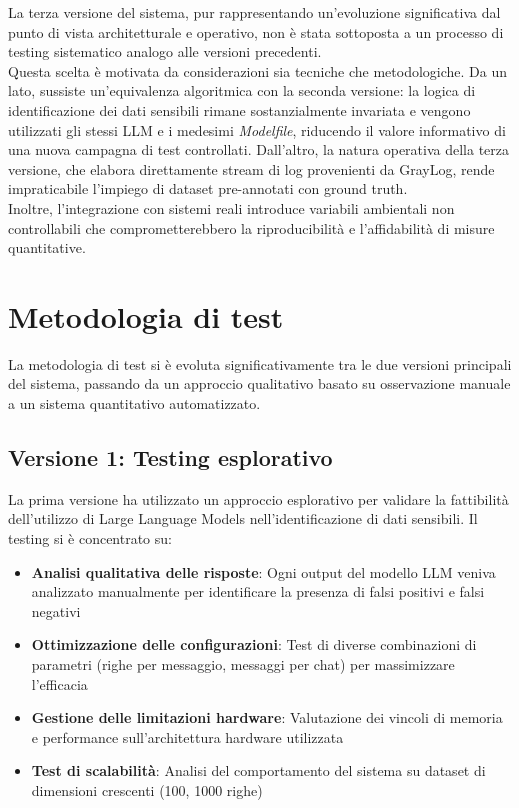 \documentclass[12pt]{report}
\begin{document}
La terza versione del sistema, pur rappresentando un'evoluzione significativa dal punto di vista architetturale e operativo, non è stata sottoposta a un processo di testing sistematico analogo alle versioni precedenti. \\
Questa scelta è motivata da considerazioni sia tecniche che metodologiche. Da un lato, sussiste un'equivalenza algoritmica con la seconda versione: la logica di identificazione dei dati sensibili rimane sostanzialmente invariata e vengono utilizzati gli stessi LLM e i medesimi \textit{Modelfile}, riducendo il valore informativo di una nuova campagna di test controllati. Dall'altro, la natura operativa della terza versione, che elabora direttamente stream di log provenienti da GrayLog, rende impraticabile l'impiego di dataset pre-annotati con ground truth. \\
Inoltre, l'integrazione con sistemi reali introduce variabili ambientali non controllabili che comprometterebbero la riproducibilità e l'affidabilità di misure quantitative.

\section{Metodologia di test}
\label{sec:metodologia_test}

La metodologia di test si è evoluta significativamente tra le due versioni principali del sistema, passando da un approccio qualitativo basato su osservazione manuale a un sistema quantitativo automatizzato.

\subsection{Versione 1: Testing esplorativo}
\label{subsec:metodologia_v1}

La prima versione ha utilizzato un approccio esplorativo per validare la fattibilità dell'utilizzo di Large Language Models nell'identificazione di dati sensibili. Il testing si è concentrato su:

\begin{itemize}
    \item \textbf{Analisi qualitativa delle risposte}: Ogni output del modello LLM veniva analizzato manualmente per identificare la presenza di falsi positivi e falsi negativi
    \item \textbf{Ottimizzazione delle configurazioni}: Test di diverse combinazioni di parametri (righe per messaggio, messaggi per chat) per massimizzare l'efficacia
    \item \textbf{Gestione delle limitazioni hardware}: Valutazione dei vincoli di memoria e performance sull'architettura hardware utilizzata
    \item \textbf{Test di scalabilità}: Analisi del comportamento del sistema su dataset di dimensioni crescenti (100, 1000 righe)
\end{itemize}
\end{document}

